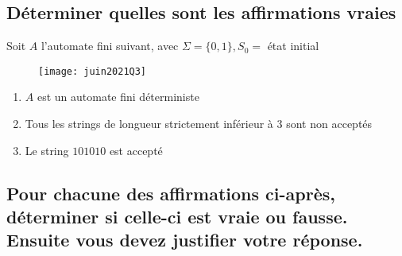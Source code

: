 \subsection*{Déterminer quelles sont les affirmations vraies}

Soit $A$ l'automate fini suivant, avec $\Sigma = \{0, 1\}, S_0 =$ état initial

\begin{figure}[H]
    \centering
    \texttt{[image: juin2021Q3]}
\end{figure}

\begin{enumerate}
\item $A$ est un automate fini déterministe\\
\item Tous les strings de longueur strictement inférieur à $3$ sont non acceptés\\
\item Le string $101010$ est accepté\\
\end{enumerate}

\subsection*{Pour chacune des affirmations ci-après, déterminer si celle-ci est vraie ou fausse. Ensuite vous devez justifier votre réponse.}

